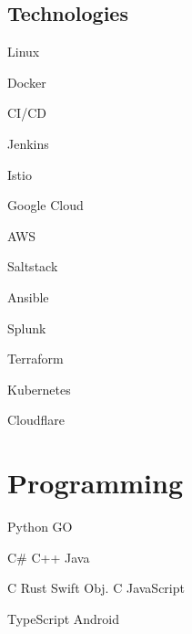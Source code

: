 \documentclass[]{cv}
\begin{document}
\begin{minipage}[t]{0.33\textwidth}
\subsection{Technologies}

\begin{tightemize}
	\item Linux
	\item Docker
	\item CI/CD
	\item Jenkins
	\item Istio
	\item Google Cloud
	\item AWS
	\item Saltstack
	\item Ansible
	\item Splunk
	\item Terraform
	\item Kubernetes
	\item Cloudflare
\end{tightemize}
\sectionsep

\section{Programming}
Python \textbullet GO
\sectionsep	

C\# \textbullet C++ \textbullet Java
\sectionsep

C \textbullet Rust \textbullet Swift \textbullet Obj. C \textbullet JavaScript
\sectionsep

TypeScript \textbullet Android

\end{minipage} 
\hfill
\end{document}
